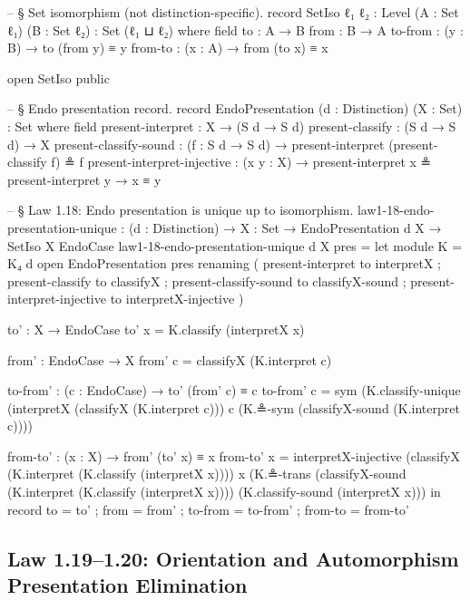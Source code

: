\documentclass[11pt,a4paper]{book}
\begin{document}
\begin{code}
-- § Set isomorphism (not distinction-specific).
record SetIso {ℓ₁ ℓ₂ : Level} (A : Set ℓ₁) (B : Set ℓ₂) : Set (ℓ₁ ⊔ ℓ₂) where
  field
    to      : A → B
    from    : B → A
    to-from : (y : B) → to (from y) ≡ y
    from-to : (x : A) → from (to x) ≡ x

open SetIso public

-- § Endo presentation record.
record EndoPresentation (d : Distinction) (X : Set) : Set where
  field
    present-interpret           : X → (S d → S d)
    present-classify            : (S d → S d) → X
    present-classify-sound      : (f : S d → S d) → present-interpret (present-classify f) ≗ f
    present-interpret-injective : (x y : X) → present-interpret x ≗ present-interpret y → x ≡ y

-- § Law 1.18: Endo presentation is unique up to isomorphism.
law1-18-endo-presentation-unique :
  (d : Distinction) →
  {X : Set} →
  EndoPresentation d X →
  SetIso X EndoCase
law1-18-endo-presentation-unique d {X} pres =
  let
    module K = K₄ d
    open EndoPresentation pres
      renaming
        ( present-interpret to interpretX
        ; present-classify to classifyX
        ; present-classify-sound to classifyX-sound
        ; present-interpret-injective to interpretX-injective
        )

    to' : X → EndoCase
    to' x = K.classify (interpretX x)

    from' : EndoCase → X
    from' c = classifyX (K.interpret c)

    to-from' : (c : EndoCase) → to' (from' c) ≡ c
    to-from' c =
      sym
        (K.classify-unique
          (interpretX (classifyX (K.interpret c)))
          c
          (K.≗-sym (classifyX-sound (K.interpret c))))

    from-to' : (x : X) → from' (to' x) ≡ x
    from-to' x =
      interpretX-injective
        (classifyX (K.interpret (K.classify (interpretX x))))
        x
        (K.≗-trans
          (classifyX-sound (K.interpret (K.classify (interpretX x))))
          (K.classify-sound (interpretX x)))
  in
  record
    { to = to'
    ; from = from'
    ; to-from = to-from'
    ; from-to = from-to'
    }
\end{code}

\subsection{Law 1.19--1.20: Orientation and Automorphism Presentation Elimination}
\end{document}
